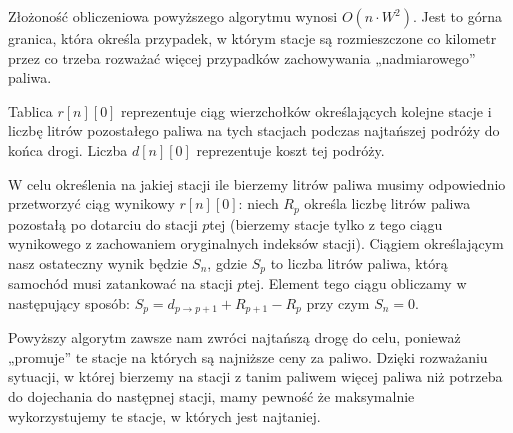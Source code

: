 \documentclass[14pt]{article}
\begin{document}
Złożoność obliczeniowa powyższego algorytmu wynosi $O(n\cdot W^2)$. Jest to górna granica, która określa przypadek, w którym stacje są rozmieszczone co kilometr przez co trzeba rozważać więcej przypadków  zachowywania „nadmiarowego” paliwa.

Tablica $r[n][0]$ reprezentuje ciąg wierzchołków określających kolejne stacje i liczbę litrów pozostałego paliwa na tych stacjach podczas najtańszej podróży do końca drogi. Liczba $d[n][0]$ reprezentuje koszt tej podróży.

W celu określenia na jakiej stacji ile bierzemy litrów paliwa musimy odpowiednio przetworzyć ciąg wynikowy $r[n][0]$: niech $R_p$ określa liczbę litrów paliwa pozostałą po dotarciu do stacji $p$tej (bierzemy stacje tylko z tego ciągu wynikowego z zachowaniem oryginalnych indeksów stacji).
Ciągiem określającym nasz ostateczny wynik będzie $S_n$, gdzie $S_p$ to liczba litrów paliwa, którą samochód musi zatankować na stacji $p$tej. Element tego ciągu obliczamy w następujący sposób: $S_p = d_{p\to p+1} + R_{p+1} - R_p$ przy czym $S_n = 0$.

Powyższy algorytm zawsze nam zwróci najtańszą drogę do celu, ponieważ „promuje” te stacje na których są najniższe ceny za paliwo. Dzięki rozważaniu sytuacji, w której bierzemy na stacji z tanim paliwem więcej paliwa niż potrzeba do dojechania do następnej stacji, mamy pewność że maksymalnie wykorzystujemy te stacje, w których jest najtaniej.
\end{document}
